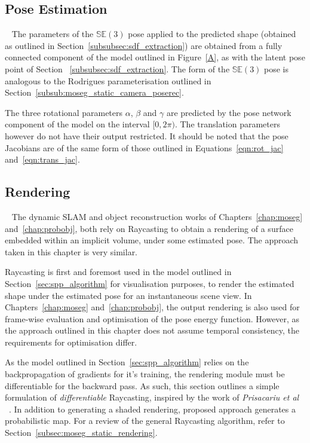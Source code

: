 \subsection{Pose Estimation}
~\label{subsec:spp_pose_estim}
The parameters of the \( \mathbb{SE}(3) \) pose applied to the predicted shape (obtained 
as outlined in Section~\ref{subsubsec:sdf_extraction}) are obtained from a fully connected 
component of the model outlined in Figure~\ref{A}, as with the latent pose point of Section
~\ref{subsubsec:sdf_extraction}. The form of the \( \mathbb{SE}(3) \) pose is analogous to 
the Rodrigues parameterisation outlined in Section~\ref{subsub:moseg_static_camera_poserec}.

The three rotational parameters \( \alpha \), \( \beta \) and \( \gamma \) are predicted by 
the pose network component of the model on the interval \( [0, 2\pi) \). The translation parameters 
however do not have their output restricted. It should be noted that the pose Jacobians are of the 
same form of those outlined in Equations~\ref{eqn:rot_jac} and~\ref{eqn:trans_jac}.

\subsection{Rendering}
~\label{subsec:spp_rendering}
The dynamic SLAM and object reconstruction works of Chapters~\ref{chap:moseg} and~\ref{chap:probobj}, 
both rely on Raycasting to obtain a rendering of a surface embedded within an implicit volume, under 
some estimated pose. The approach taken in this chapter is very similar. 

Raycasting is first and foremost used in the model outlined in Section~\ref{sec:spp_algorithm} for 
visualisation purposes, to render the estimated shape under the estimated pose for an instantaneous scene 
view. In Chapters~\ref{chap:moseg} and~\ref{chap:probobj}, the output rendering is also used for frame-wise 
evaluation and optimisation of the pose energy function. However, as the approach outlined in this chapter 
does not assume temporal consistency, the requirements for optimisation differ.

As the model outlined in Section~\ref{sec:spp_algorithm} relies on the backpropagation of gradients for it's 
training, the rendering module must be differentiable for the backward pass. As such, this section outlines a 
simple formulation of \textit{differentiable} Raycasting, inspired by the work of \textit{Prisacariu et al}
~\cite{Prisacariu2011}. In addition to generating a shaded rendering, proposed approach generates a probabilistic 
map. For a review of the general Raycasting algorithm, refer to Section~\ref{subsec:moseg_static_rendering}.

